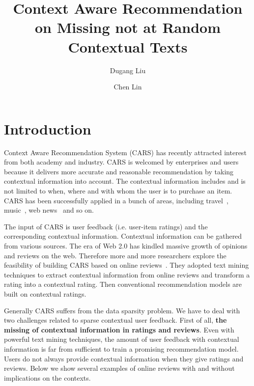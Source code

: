 \documentclass{llncs}
\begin{document}
\title{Context Aware Recommendation on Missing not at Random Contextual Texts}
\author{Dugang Liu \and Chen Lin}
\maketitle

\begin{abstract}

\end{abstract}

\section{Introduction}\label{sec:intro}
Context Aware Recommendation System (CARS) has recently attracted  interest from both academy and industry. CARS is welcomed by enterprises and users because it delivers more accurate and reasonable recommendation by taking contextual information into account. The contextual information includes and is not limited to when, where and with whom the user is to purchase an item. CARS has been successfully applied in a bunch of areas, including travel~\cite{Biancalana2013Approach}, music~\cite{Cai2007MusicSense}, web news~\cite{Wang2015CROWN} and so on. 


The input of CARS is user feedback (i.e. user-item ratings) and the corresponding contextual information. Contextual information can be gathered from various sources. The era of Web 2.0 has kindled massive growth of opinions and reviews on the web. Therefore more and more researchers explore the feasibility of building CARS based on online reviews~\cite{Li2010Contextual,Levi2012Finding,Hariri2013Query,Liu2013Combining,Marcelo2016Mining}. They adopted text mining techniques to extract contextual information from online reviews and transform a rating into a contextual rating. Then conventional recommendation models are built on contextual ratings.

Generally CARS suffers from the data sparsity problem. We have to deal with two challenges related to sparse contextual user feedback. First of all, \textbf{the missing of contextual information in ratings and reviews}. Even with powerful text mining techniques, the amount of user feedback with contextual information is far from sufficient to train a promising recommendation model. Users do not always provide contextual information when they give ratings and reviews. Below we show several examples of online reviews with and without implications on the contexts.
\end{document}
